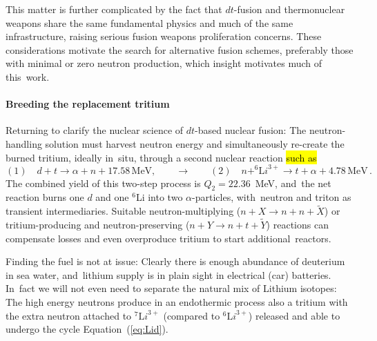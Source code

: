 \documentclass[particles,article,accept,pdftex,moreauthors]{Definitions/mdpi}
\begin{document}
This matter is further complicated by the fact that $dt$-fusion and thermonuclear weapons share the same fundamental physics and much of the same infrastructure, raising serious fusion weapons proliferation concerns. These considerations motivate the search for alternative fusion schemes, preferably those with minimal or zero neutron production, which insight motivates much of this~work.

\vspace{-6pt}\paragraph*{\bf Breeding the replacement tritium}
Returning to clarify the nuclear science of $dt$-based nuclear fusion: The neutron-handling solution must harvest neutron energy and simultaneously re-create the burned tritium, ideally in~situ, through a second nuclear reaction \hl{such as} %
\begin{equation}\label{eq:Lid}
(1)\quad d+t\to \alpha +n +17.58\,\mathrm{MeV}, \qquad\to \qquad (2)\quad n+^{6\!}{\mathrm Li}^{3+}\to t +\alpha + 4.78\,\mathrm{MeV}\,.
\end{equation}
The combined yield of this two-step process is $Q_2=22.36$~MeV, and~the net reaction burns one $d$ and one ${}^6$Li into two $\alpha$-particles, with~neutron and triton as transient intermediaries. Suitable neutron-multiplying ($n+X\to n+n+\tilde X$) or tritium-producing and neutron-preserving ($n+Y\to n+t+\tilde Y$) reactions can compensate losses and even overproduce tritium to start additional~reactors. 

Finding the fuel is not at issue: Clearly there is enough abundance of deuterium in sea water, and~lithium supply is in plain sight in electrical (car) batteries. In~fact we will not even need to separate the natural mix of Lithium isotopes: The high energy neutrons produce in an endothermic process also a tritium with the extra neutron attached to $^{7\!}{\mathrm Li}^{3+}$ (compared to $^{6\!}{\mathrm Li}^{3+}$) released and able to undergo the cycle Equation~(\ref{eq:Lid}).
\end{document}
